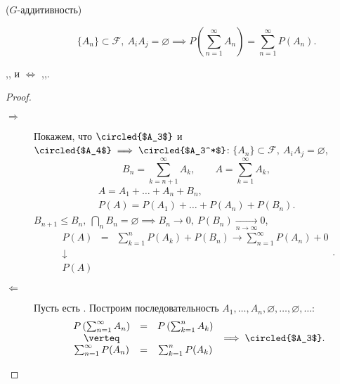 \begin{description}
  \item[ ($G$-аддитивность)]
  \[
    \{A_n\}\subset \mathcal{F}, \ A_iA_j = \varnothing \implies P \left(\sum_{n=1}^{\infty}A_n\right) = \sum_{n=1}^{\infty }P(A_n).
  \]
\end{description}

\begin{theorem}
  ,, и  $\iff$ ,,.
\end{theorem}

\begin{proof}\leavevmode
  \begin{description}
    \item[$\boxed{\Rightarrow}$] Покажем, что $\circled{$A_3$}$ и $\circled{$A_4$} \implies \circled{$A_3^*$}$: $\{A_n\}\subset \mathcal{F}, \ A_iA_j = \varnothing$,
    \[
      B_n = \sum_{k=n+1}^{\infty }A_k, \qquad A = \sum_{k=1}^{\infty }A_k,
    \]
    \[
      \begin{array}{c}
        A = A_1 + \ldots + A_n + B_n, \\
        P(A) = P(A_1) + \ldots + P(A_n) + P(B_n).
      \end{array}
    \]
    $B_{n+1} \leqslant B_n, \ \bigcap_{n}B_n = \varnothing \implies B_n \rightarrow 0, \ P(B_n) \xrightarrow[n \rightarrow \infty ]{} 0$,
    \[
      \begin{array}{ccc}
        P(A) & = & \sum_{k=1}^{n}P(A_k) + P(B_n) \rightarrow \sum_{n=1}^{\infty }P(A_n) + 0 \\
        \downarrow & & \\
        P(A) & & 
      \end{array}.
    \]

    \item[$\boxed{\Leftarrow}$] Пусть есть . Построим последовательность $A_1,\ldots,A_n,\varnothing,\ldots,\varnothing,\ldots$:
    \[
      \begin{array}{ccc}
        P \left(\sum_{n=1}^{\infty }A_n\right) & = & P \left(\sum_{k=1}^{n}A_k\right) \\
        \verteq & & \\
        \sum_{n=1}^{\infty }P(A_n) & = & \sum_{k=1}^{n}P(A_k)
      \end{array} \implies \circled{$A_3$}.
    \]
    \begin{figure}[H]
      \centering
      \label{fig:fig-2}
    \end{figure}


\end{description}
\end{proof}
